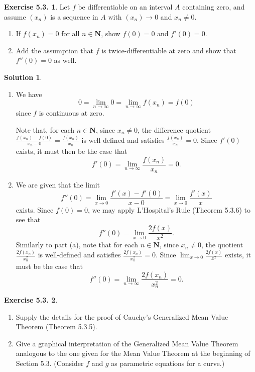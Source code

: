 \documentclass[12pt]{article}
\theoremstyle{definition}
\theoremstyle{exercise}
\newtheorem{exercise}{Exercise 5.3.}
\theoremstyle{solution}
\newtheorem*{solution}{Solution}
\newcommand{\N}{\mathbf{N}}
\begin{document}
\begin{exercise}
\label{ex:4}
    Let \( f \) be differentiable on an interval \( A \) containing zero, and assume \( (x_n) \) is a sequence in \( A \) with \( (x_n) \to 0 \) and \( x_n \neq 0 \).
    \begin{enumerate}
        \item If \( f(x_n) = 0 \) for all \( n \in \N \), show \( f(0) = 0 \) and \( f'(0) = 0 \).

        \item Add the assumption that \( f \) is twice-differentiable at zero and show that \( f''(0) = 0 \) as well.
    \end{enumerate}
\end{exercise}

\begin{solution}
    \begin{enumerate}
        \item We have
        \[
            0 = \lim_{n \to \infty} 0 = \lim_{n \to \infty} f(x_n) = f(0)
        \]
        since \( f \) is continuous at zero.

        Note that, for each \( n \in \N \), since \( x_n \neq 0 \), the difference quotient \( \frac{f(x_n) - f(0)}{x_n - 0} = \frac{f(x_n)}{x_n} \) is well-defined and satisfies \( \frac{f(x_n)}{x_n} = 0 \). Since \( f'(0) \) exists, it must then be the case that
        \[
            f'(0) = \lim_{n \to \infty} \frac{f(x_n)}{x_n} = 0.
        \]

        \item We are given that the limit
        \[
            f''(0) = \lim_{x \to 0} \frac{f'(x) - f'(0)}{x - 0} = \lim_{x \to 0} \frac{f'(x)}{x}
        \]
        exists. Since \( f(0) = 0 \), we may apply L'Hospital's Rule (Theorem 5.3.6) to see that
        \[
            f''(0) = \lim_{x \to 0} \frac{2 f(x)}{x^2}.
        \]
        Similarly to part (a), note that for each \( n \in \N \), since \( x_n \neq 0 \), the quotient \( \frac{2 f(x_n)}{x_n^2} \) is well-defined and satisfies \( \frac{2 f(x_n)}{x_n^2} = 0 \). Since \( \lim_{x \to 0} \frac{2 f(x)}{x^2} \) exists, it must be the case that
        \[
            f''(0) = \lim_{n \to \infty} \frac{2 f(x_n)}{x_n^2} = 0.
        \]
    \end{enumerate}
\end{solution}

\begin{exercise}
\label{ex:5}
    \begin{enumerate}
        \item Supply the details for the proof of Cauchy's Generalized Mean Value Theorem (Theorem 5.3.5).

        \item Give a graphical interpretation of the Generalized Mean Value Theorem analogous to the one given for the Mean Value Theorem at the beginning of Section 5.3. (Consider \( f \) and \( g \) as parametric equations for a curve.)
    \end{enumerate}
\end{exercise}
\end{document}
